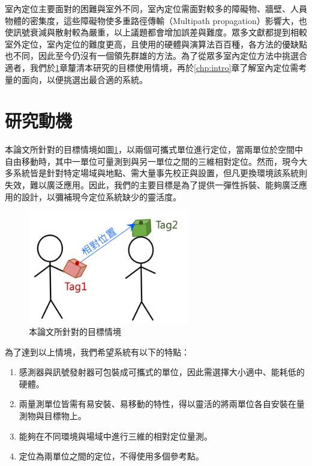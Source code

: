 室內定位主要面對的困難與室外不同，室內定位需面對較多的障礙物、牆壁、人員物體的密集度，這些障礙物使多重路徑傳輸（Multipath propagation）影響大，也使訊號衰減與散射較為嚴重，以上議題都會增加誤差與難度。眾多文獻都提到相較室外定位，室內定位的難度更高\cite{survey_light2020}\cite{survey_light2018}\cite{survey_indoor2014}\cite{survey_indoor2018}\cite{survey:indoor_wayfinding}，且使用的硬體與演算法百百種，各方法的優缺點也不同，因此至今仍沒有一個領先群雄的方法。為了從眾多室內定位方法中挑選合適者，我們於\ref{chp:motivate}章釐清本研究的目標使用情境，再於\ref{chp:intro}章了解室內定位需考量的面向，以便挑選出最合適的系統。






\section{研究動機}
\label{chp:motivate}

本論文所針對的目標情境如圖\ref{pic:imagine}，以兩個可攜式單位進行定位，當兩單位於空間中自由移動時，其中一單位可量測到與另一單位之間的三維相對定位。然而，現今大多系統皆是針對特定場域與地點、需大量事先校正與設置，但凡更換環境該系統則失效，難以廣泛應用。因此，我們的主要目標是為了提供一彈性拆裝、能夠廣泛應用的設計，以彌補現今定位系統缺少的靈活度。

\begin{figure}[ht]
    \centering
    \includegraphics[width=7cm]{ch1pic/imagine.png}
    \caption{本論文所針對的目標情境}
    \label{pic:imagine}
\end{figure}

為了達到以上情境，我們希望系統有以下的特點：

\begin{enumerate}
    \item 感測器與訊號發射器可包裝成可攜式的單位，因此需選擇大小適中、能耗低的硬體。
    \item 兩量測單位皆需有易安裝、易移動的特性，得以靈活的將兩單位各自安裝在量測物與目標物上。
    \item 能夠在不同環境與場域中進行三維的相對定位量測。
    \item 定位為兩單位之間的定位，不得使用多個參考點。
\end{enumerate}


